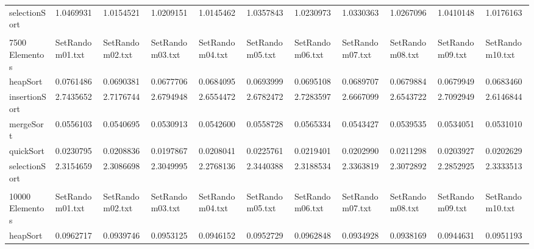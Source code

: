 \documentclass[article,a4paper]{article}
\begin{document}
\begin{table}[h]
{\begin{tabular}{lllllllllll}
selectionSort   & 1.0469931       & 1.0154521       & 1.0209151       & 1.0145462       & 1.0357843       & 1.0230973       & 1.0330363       & 1.0267096       & 1.0410148       & 1.0176163       \\
                &                 &                 &                 &                 &                 &                 &                 &                 &                 &                 \\
7500 Elementos  & SetRandom01.txt & SetRandom02.txt & SetRandom03.txt & SetRandom04.txt & SetRandom05.txt & SetRandom06.txt & SetRandom07.txt & SetRandom08.txt & SetRandom09.txt & SetRandom10.txt \\
heapSort        & 0.0761486       & 0.0690381       & 0.0677706       & 0.0684095       & 0.0693999       & 0.0695108       & 0.0689707       & 0.0679884       & 0.0679949       & 0.0683460       \\
insertionSort   & 2.7435652       & 2.7176744       & 2.6794948       & 2.6554472       & 2.6782472       & 2.7283597       & 2.6667099       & 2.6543722       & 2.7092949       & 2.6146844       \\
mergeSort       & 0.0556103       & 0.0540695       & 0.0530913       & 0.0542600       & 0.0558728       & 0.0565334       & 0.0543427       & 0.0539535       & 0.0534051       & 0.0531010       \\
quickSort       & 0.0230795       & 0.0208836       & 0.0197867       & 0.0208041       & 0.0225761       & 0.0219401       & 0.0202990       & 0.0211298       & 0.0203927       & 0.0202629       \\
selectionSort   & 2.3154659       & 2.3086698       & 2.3049995       & 2.2768136       & 2.3440388       & 2.3188534       & 2.3363819       & 2.3072892       & 2.2852925       & 2.3333513       \\
                &                 &                 &                 &                 &                 &                 &                 &                 &                 &                 \\
10000 Elementos & SetRandom01.txt & SetRandom02.txt & SetRandom03.txt & SetRandom04.txt & SetRandom05.txt & SetRandom06.txt & SetRandom07.txt & SetRandom08.txt & SetRandom09.txt & SetRandom10.txt \\
heapSort        & 0.0962717       & 0.0939746       & 0.0953125       & 0.0946152       & 0.0952729       & 0.0962848       & 0.0934928       & 0.0938169       & 0.0944631       & 0.0951193       \\

\end{tabular}}
\end{table}
\end{document}

